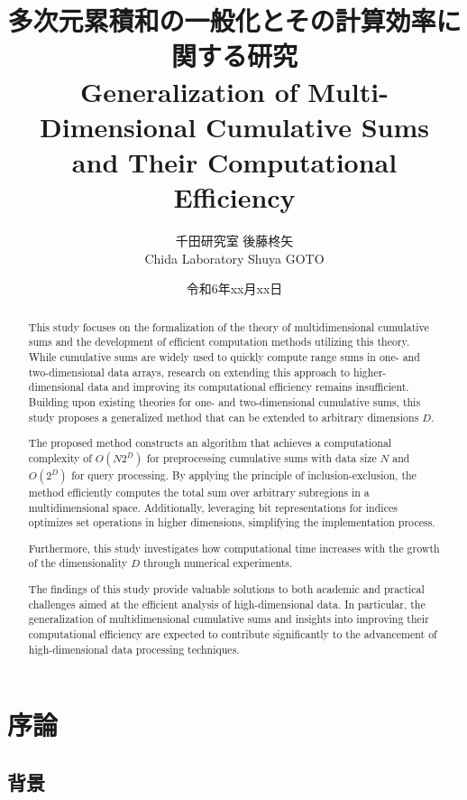 \documentclass{jsreport}
\title{多次元累積和の一般化とその計算効率に関する研究 \\Generalization of Multi-Dimensional Cumulative Sums \\ and Their Computational Efficiency}
\author{千田研究室 \quad 後藤柊矢\\Chida Laboratory \quad Shuya GOTO}
\date{令和6年xx月xx日}
\theoremstyle{plain} %
\theoremstyle{definition}
\begin{document}
\maketitle

\renewcommand{\abstractname}{Abstract}
\begin{abstract}
This study focuses on the formalization of the theory of multidimensional cumulative sums and the development of efficient computation methods utilizing this theory. While cumulative sums are widely used to quickly compute range sums in one- and two-dimensional data arrays, research on extending this approach to higher-dimensional data and improving its computational efficiency remains insufficient. Building upon existing theories for one- and two-dimensional cumulative sums, this study proposes a generalized method that can be extended to arbitrary dimensions \(D\).

The proposed method constructs an algorithm that achieves a computational complexity of \({O}(N 2^D)\) for preprocessing cumulative sums with data size \(N\) and \({O}(2^D)\) for query processing. By applying the principle of inclusion-exclusion, the method efficiently computes the total sum over arbitrary subregions in a multidimensional space. Additionally, leveraging bit representations for indices optimizes set operations in higher dimensions, simplifying the implementation process.

Furthermore, this study investigates how computational time increases with the growth of the dimensionality \(D\) through numerical experiments.

The findings of this study provide valuable solutions to both academic and practical challenges aimed at the efficient analysis of high-dimensional data. In particular, the generalization of multidimensional cumulative sums and insights into improving their computational efficiency are expected to contribute significantly to the advancement of high-dimensional data processing techniques.

\end{abstract}

\tableofcontents

\chapter{序論}

\section{背景}
\end{document}
